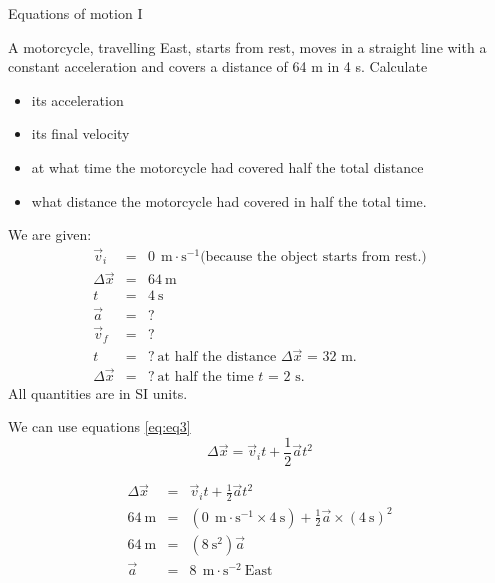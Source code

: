 \begin{wex}{Equations of motion I}{A motorcycle, travelling East, starts from rest, moves in a straight line with a constant acceleration and covers a distance of 64 m in 4 s. Calculate
\begin{itemize}
\item its acceleration
\item its final velocity
\item at what time the motorcycle had covered half the total distance
\item what distance the motorcycle had covered in half the total time.
\end{itemize}}
{
We are given:
\begin{eqnarray*}
\vec{v}_i&=&0\ ~\text{m}\cdot \text{s}^{-1} \mbox{(because the object starts from rest.)}\\
\Delta \vec{x}&=&64\ \text{m}\\
t&=&4\ \text{s}\\
\vec{a}&=&?\\
\vec{v}_f&=&?\\
t&=&?\ \mbox{at half the distance $\Delta \vec{x}$~=~32~m.}\\
\Delta \vec{x}&=&?\ \mbox{at half the time $t$~=~2~s.}
\end{eqnarray*}
All quantities are in SI units.

We can use equations \ref{eq:eq3}
\begin{displaymath}
\Delta \vec{x} = \vec{v}_it +\frac{1}{2}\vec{a}t^2
\end{displaymath}

\begin{eqnarray*}
\Delta \vec{x} &=& \vec{v}_it +\frac{1}{2}\vec{a}t^2\\
64\ \text{m} &=& (0\ ~\text{m}\cdot \text{s}^{-1} \times 4\ \text{s}) + \frac{1}{2} \vec{a} \times (4\ \text{s})^2\\
64\ \text{m} &=& (8\ \text{s}^2) \vec{a}\\
\vec{a} &=&8\ ~\text{m}\cdot \text{s}^{-2}~\text{East}
\end{eqnarray*}

}
\end{wex}
